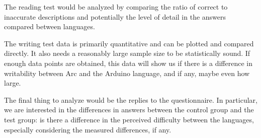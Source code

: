 The reading test would be analyzed by comparing the ratio of correct to inaccurate descriptions and potentially the level of detail in the answers compared between languages. 

The writing test data is primarily quantitative and can be plotted and compared directly. It also needs a reasonably large sample size to be statistically sound. If enough data points are obtained, this data will show us if there is a difference in writability between Arc and the Arduino language, and if any, maybe even how large.  

The final thing to analyze would be the replies to the questionnaire. In particular, we are interested in the differences in answers between the control group and the test group: is there a difference in the perceived difficulty between the languages, especially considering the measured differences, if any.
